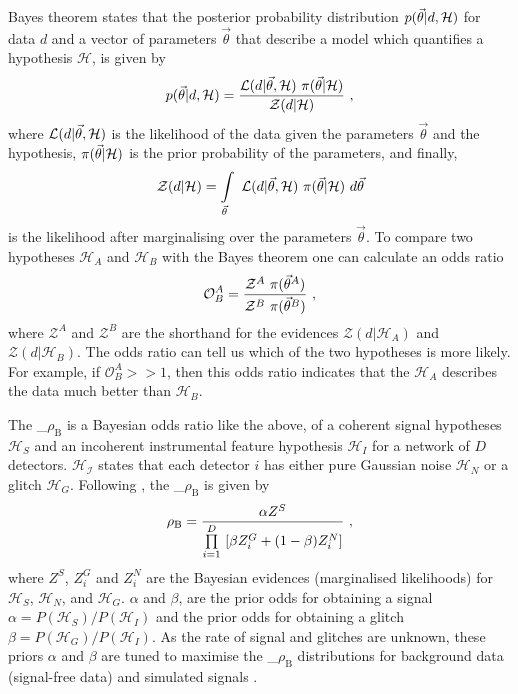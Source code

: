 \documentclass[%
 amsmath,amssymb,
 aps,
twocolumn
]{revtex4}
\newcommand{\mathcmd}[1]{{\sc \relax\ifmmode#1\else $#1$\fi}\xspace}
\newcommand{\bcr}{\mathcmd{\rho_\text{B}}}
\newcommand{\parameters}{\mathcmd{\vec{\theta}}}
\begin{document}
Bayes theorem states that the posterior probability distribution $p(\parameters|d,\mathcal{H})$ for data $d$ and a vector of parameters \parameters that describe a model which quantifies a hypothesis $\mathcal{H}$, is given by
\begin{equation}
p(\parameters|d,\mathcal{H}) = \frac{\mathcal{L}(d|\parameters, \mathcal{H}) \ \pi(\parameters | \mathcal{H})}{\mathcal{Z}(d|\mathcal{H})}\ , 
\end{equation}
where $\mathcal{L}(d|\parameters, \mathcal{H})$ is the likelihood of the data given the parameters \parameters and the hypothesis, $\pi(\parameters | \mathcal{H})$ is the prior probability of the parameters, and finally,
\begin{equation}
    \mathcal{Z}(d|\mathcal{H}) = \int\limits_{\parameters} \ \mathcal{L}(d|\parameters,\mathcal{H}) \ \pi(\parameters | \mathcal{H}) \ d\parameters
\end{equation} is the likelihood after marginalising over the parameters \parameters.  To compare two hypotheses $\mathcal{H}_A$ and $\mathcal{H}_B$ with the Bayes theorem one can calculate an odds ratio
\begin{equation}
    \mathcal{O}^A_B = \frac{\mathcal{Z}^A\ \pi(\parameters^A)}{\mathcal{Z}^B\ \pi(\parameters^B)}\ ,
\end{equation}
where $\mathcal{Z}^A$ and $\mathcal{Z}^B$ are the shorthand for the evidences  $\mathcal{Z}(d|\mathcal{H}_A)$ and $\mathcal{Z}(d|\mathcal{H}_B)$. The odds ratio can tell us which of the two hypotheses is more likely. For example, if $\mathcal{O}^A_B >> 1$, then this odds ratio indicates that the $\mathcal{H}_A$ describes the data much better than $\mathcal{H}_B$. 

The \bcr is a Bayesian odds ratio like the above, of a coherent signal hypotheses $\mathcal{H}_S$ and an incoherent instrumental feature hypothesis $\mathcal{H}_I$ for a network of $D$ detectors. $\mathcal{H_I}$ states that each detector $i$ has either pure Gaussian noise $\mathcal{H}_N$ or a glitch $\mathcal{H}_G$. Following \citet{BCR1}, the \bcr is given by
\begin{equation}
\label{eq:bcr}
\bcr = \frac{\alpha Z^S}{\prod\limits^D_{i=1} \ [\beta Z^G_i + (1-\beta)Z^N_i]}\ ,
\end{equation}
where $Z^S$, $Z^G_i$ and $Z^N_i$ are the Bayesian evidences (marginalised likelihoods) for $\mathcal{H}_S$, $\mathcal{H}_N$, and $\mathcal{H}_G$. $\alpha$ and $\beta$, are the prior odds for obtaining a signal $\alpha=P(\mathcal{H}_S)/P(\mathcal{H}_I)$ and the prior odds for obtaining a glitch $\beta=P(\mathcal{H}_G)/P(\mathcal{H}_I)$. As the rate of signal and glitches are unknown, these priors $\alpha$ and $\beta$ are tuned to maximise the \bcr distributions for background data (signal-free data) and simulated signals \cite{BCR1}.  
\end{document}
